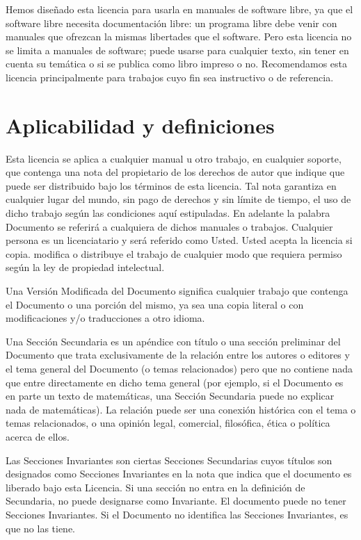 Hemos diseñado esta licencia para usarla en manuales de software libre,
ya que el software libre necesita documentación libre: un programa
libre debe venir con manuales que ofrezcan la mismas libertades que
el software. Pero esta licencia no se limita a manuales de software;
puede usarse para cualquier texto, sin tener en cuenta su temática
o si se publica como libro impreso o no. Recomendamos esta licencia
principalmente para trabajos cuyo fin sea instructivo o de referencia.

\section{Aplicabilidad y definiciones}

Esta licencia se aplica a cualquier manual u otro trabajo, en cualquier
soporte, que contenga una nota del propietario de los derechos de
autor que indique que puede ser distribuido bajo los términos de esta
licencia. Tal nota garantiza en cualquier lugar del mundo, sin pago
de derechos y sin límite de tiempo, el uso de dicho trabajo según
las condiciones aquí estipuladas. En adelante la palabra Documento
se referirá a cualquiera de dichos manuales o trabajos. Cualquier
persona es un licenciatario y será referido como Usted. Usted acepta
la licencia si copia. modifica o distribuye el trabajo de cualquier
modo que requiera permiso según la ley de propiedad intelectual.

Una Versión Modificada del Documento significa cualquier trabajo que
contenga el Documento o una porción del mismo, ya sea una copia literal
o con modificaciones y/o traducciones a otro idioma.

Una Sección Secundaria es un apéndice con título o una sección preliminar
del Documento que trata exclusivamente de la relación entre los autores
o editores y el tema general del Documento (o temas relacionados)
pero que no contiene nada que entre directamente en dicho tema general
(por ejemplo, si el Documento es en parte un texto de matemáticas,
una Sección Secundaria puede no explicar nada de matemáticas). La
relación puede ser una conexión histórica con el tema o temas relacionados,
o una opinión legal, comercial, filosófica, ética o política acerca
de ellos.

Las Secciones Invariantes son ciertas Secciones Secundarias cuyos
títulos son designados como Secciones Invariantes en la nota que indica
que el documento es liberado bajo esta Licencia. Si una sección no
entra en la definición de Secundaria, no puede designarse como Invariante.
El documento puede no tener Secciones Invariantes. Si el Documento
no identifica las Secciones Invariantes, es que no las tiene.

